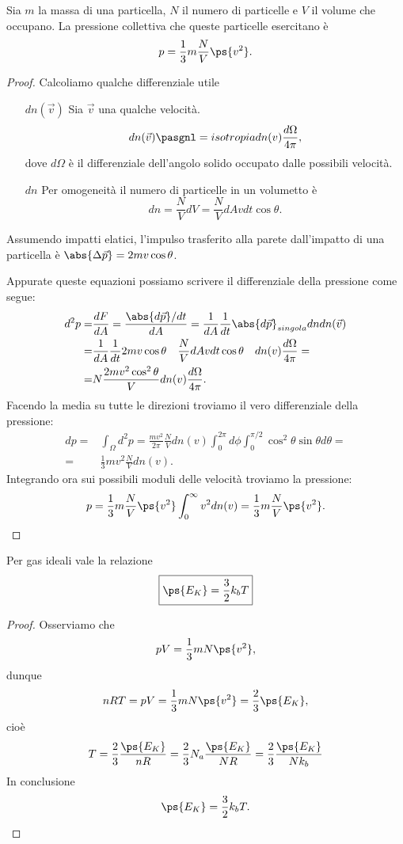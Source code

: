 \begin{proposition}\label{CalcoloDellaPressioneTeoriaCineticaDeiGas}
Sia $m$ la massa di una particella, $N$ il numero di particelle e $V$ il volume che occupano. La pressione collettiva che queste particelle esercitano \`e
\[p=\frac13m\frac NV\ps{v^2}.\]
\end{proposition}
\begin{proof}
Calcoliamo qualche differenziale utile
\setlength{\leftmargini}{0cm}
\begin{itemize}
\item[$\boxed{dn(\vec v)}$] Sia $\vec v$ una qualche velocit\`a.
\[dn(\vec v)\pasgnl={isotropia}dn(v)\frac{d\Omega}{4\pi},\]
dove $d\Omega$ \`e il differenziale dell'angolo solido occupato dalle possibili velocit\`a. 
\item[$\boxed{dn}$] Per omogeneit\`a il numero di particelle in un volumetto \`e
\[dn=\frac NVdV=\frac NV dAvdt\cos\theta.\]
\end{itemize}
\setlength{\leftmargini}{0.5cm}
Assumendo impatti elatici, l'impulso trasferito alla parete dall'impatto di una particella \`e $\abs{\Delta \vec p}=2mv\cos \theta$.\medskip

\noindent Appurate queste equazioni possiamo scrivere il differenziale della pressione come segue:
\begin{align*}
d^2p=&\frac{dF}{dA}=\frac{\abs{d\vec p}/dt}{dA}=\frac1{dA}\frac1{dt}\abs{d\vec p}_{singola}dn dn(\vec v)\\
=&\frac1{dA}\frac1{dt}{2mv\cos \theta}\quad{\frac{N}V dAvdt\cos \theta}\quad{dn(v)\frac{d\Omega}{4\pi}}=\\
=&N\frac{2mv^2\cos^2\theta}Vdn(v)\frac{d\Omega}{4\pi}.
\end{align*}
Facendo la media su tutte le direzioni troviamo il vero differenziale della pressione:
\begin{align*}
dp=&\int_\Omega d^2p=\frac{mv^2}{2\pi}\frac NVdn(v)\int_0^{2\pi}d\phi\int_0^{\pi/2}\cos^2\theta\sin\theta d\theta=\\
=&\frac13mv^2\frac NVdn(v).
\end{align*}
Integrando ora sui possibili moduli delle velocit\`a troviamo la pressione:
\[p=\frac13m\frac NV\ps{v^2}\int_0^\infty v^2dn(v)=\frac13m\frac NV\ps{v^2}.\]
\end{proof}


\begin{proposition}
Per gas ideali vale la relazione
\[\boxed{\ps{E_K}=\frac32 k_b T}\]
\end{proposition}
\begin{proof}
Osserviamo che
\[pV=\frac13 mN\ps{v^2},\]
dunque
\[nRT=pV=\frac13 mN\ps{v^2}=\frac23\ps{E_K},\]
cio\`e
\[T=\frac 23\frac{\ps{E_K}}{nR}=\frac 23N_a\frac{\ps{E_K}}{NR}=\frac 23\frac{\ps{E_K}}{Nk_b}\]
In conclusione
\[\ps{E_K}=\frac32 k_b T.\]
\end{proof}

